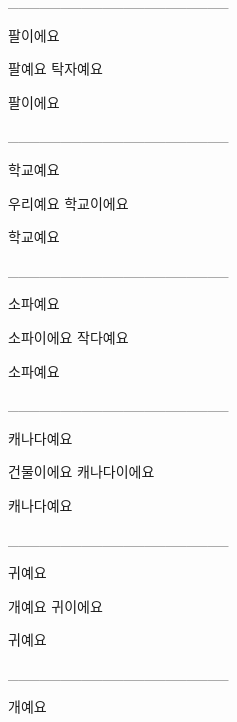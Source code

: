 \documentclass[addpoints, 30pt]{../exam}%
\begin{document}
\begin{questions}
\begin{solution}
\end{solution}%
\question[1]%
\_\_\_\_\_\_\_\_\_\_\_\_\_\_\_\_\_\_\_\_\_%
\begin{choices}%
\begin{solution}%
팔이에요%
\end{solution}%
\choice%
팔예요%
\CorrectChoice%
탁자예요%
\end{choices}%
\begin{solution}%
팔이에요%
\end{solution}%
\question[1]%
\_\_\_\_\_\_\_\_\_\_\_\_\_\_\_\_\_\_\_\_\_%
\begin{choices}%
\begin{solution}%
학교예요%
\end{solution}%
\CorrectChoice%
우리예요%
\choice%
학교이에요%
\end{choices}%
\begin{solution}%
학교예요%
\end{solution}%
\question[1]%
\_\_\_\_\_\_\_\_\_\_\_\_\_\_\_\_\_\_\_\_\_%
\begin{choices}%
\begin{solution}%
소파예요%
\end{solution}%
\choice%
소파이에요%
\CorrectChoice%
작다예요%
\end{choices}%
\begin{solution}%
소파예요%
\end{solution}%
\question[1]%
\_\_\_\_\_\_\_\_\_\_\_\_\_\_\_\_\_\_\_\_\_%
\begin{choices}%
\begin{solution}%
캐나다예요%
\end{solution}%
\CorrectChoice%
건물이에요%
\choice%
캐나다이에요%
\end{choices}%
\begin{solution}%
캐나다예요%
\end{solution}%
\question[1]%
\_\_\_\_\_\_\_\_\_\_\_\_\_\_\_\_\_\_\_\_\_%
\begin{choices}%
\begin{solution}%
귀예요%
\end{solution}%
\CorrectChoice%
개예요%
\choice%
귀이에요%
\end{choices}%
\begin{solution}%
귀예요%
\end{solution}%
\question[1]%
\_\_\_\_\_\_\_\_\_\_\_\_\_\_\_\_\_\_\_\_\_%
\begin{choices}%
\begin{solution}%
개예요%
\end{solution}%

\end{choices}
\end{questions}
\end{document}
